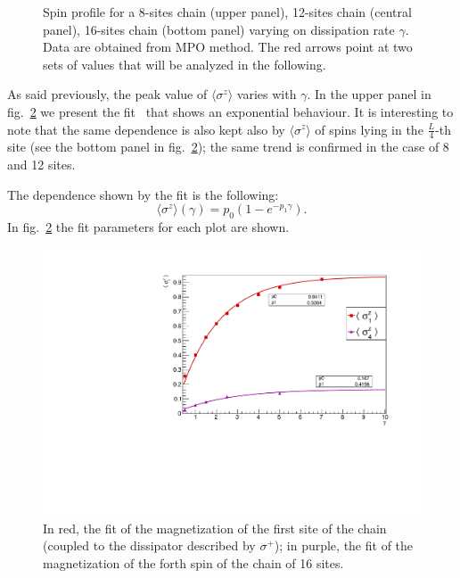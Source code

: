 \begin{figure}[H]
    \label{fig:16sites_LMvsGamma}
\captionsetup{width=1.\linewidth}
\caption{Spin profile for a 8-sites chain (upper panel), 12-sites chain (central panel), 16-sites chain (bottom panel) varying on dissipation rate $\gamma$. Data are obtained from MPO method. The red arrows point at two sets of values that will be analyzed in the following.}
\label{fig:LMvsGamma3panelsSizes}
\end{figure}

As said previously, the peak value of $\langle\sigma^z\rangle$ varies with $\gamma$. In the upper panel in fig.~\ref{fig:LM_PeakAnd4th_vsGamma} we present the fit~\cite{root_cern} that shows an exponential behaviour. It is interesting to note that the same dependence is also kept also by $\langle\sigma^z\rangle$ of spins lying in the $\frac{L}{4}$-th site (see the bottom panel in fig.~\ref{fig:LM_PeakAnd4th_vsGamma}); the same trend is confirmed in the case of 8 and 12 sites.

The dependence shown by the fit is the following:
\begin{equation*}
    \langle \sigma^z \rangle(\gamma) = p_0 (1- e^{-p_1\gamma}).
\end{equation*}
In fig.~\ref{fig:LM_PeakAnd4th_vsGamma} the fit parameters for each plot are shown.

\begin{figure}[H]
\centering
\includegraphics[scale = 0.6]{Figures/LMvsGammaVsSiteIndex.pdf}
\captionsetup{width=1.\linewidth}
\caption{In red, the fit of the magnetization of the first site of the chain (coupled to the dissipator described by $\sigma^+$); in purple, the fit of the magnetization of the forth spin of the chain of 16 sites.}
\label{fig:LM_PeakAnd4th_vsGamma}
\end{figure}

